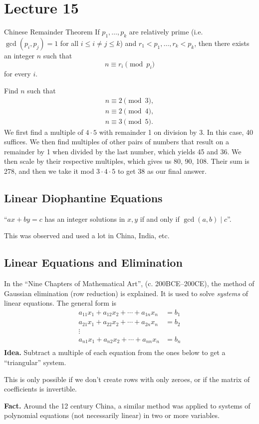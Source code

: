 \documentclass[class=article, crop=false]{standalone}
\begin{document}
  \section{Lecture 15}
  \begin{theorem}{Chinese Remainder Theorem}
    If $p_1, \dotsc, p_k$ are relatively prime (i.e. $\gcd(p_i, p_j) = 1$ for all $i \leq i\neq j \leq k$) and $r_1 < p_1,\dotsc, r_k < p_k$, then there exists an integer $n$ such that
    \[
      n\equiv r_i\pmod {p_i}
    \]
    for every $i$.
  \end{theorem}
  \begin{example}{}
    Find $n$ such that
    \begin{align*}
      n\equiv 2\pmod 3, \\
      n\equiv 2\pmod 4, \\
      n\equiv 3\pmod 5.
    \end{align*}
    We first find a multiple of $4\cdot 5$ with remainder 1 on division by 3. In this case, 40 suffices. We then find multiples of other pairs of numbers that result on a remainder by 1 when divided by the last number, which yields 45 and 36. We then scale by their respective multiples, which gives us 80, 90, 108. Their sum is 278, and then we take it mod $3\cdot 4\cdot 5$ to get 38 as our final answer.
  \end{example}
  \subsection{Linear Diophantine Equations}
  ``$ax + by = c$ has an integer solutions in $x, y$ if and only if $\gcd(a, b)\mid c$''. \par
  This was observed and used a lot in China, India, etc.
  \subsection{Linear Equations and Elimination}
  In the ``Nine Chapters of Mathematical Art'', (c. 200BCE--200CE), the method of Gaussian elimination (row reduction) is explained. It is used to solve \emph{systems} of linear equations. The general form is
  \begin{align*}
    a_{11}x_1 + a_{12}x_2 + \dotsb + a_{1n}x_n &= b_1 \\
    a_{21}x_1 + a_{22}x_2 + \dotsb + a_{2n}x_n &= b_2 \\
    \vdots\hspace{43pt} \\
    a_{n1}x_1 + a_{n2}x_2 + \dotsb + a_{nn}x_n &= b_n \\
  \end{align*}
  \textbf{Idea.} Subtract a multiple of each equation from the ones below to get a ``triangular'' system.
  \begin{note}{}
    This is only possible if we don't create rows with only zeroes, or if the matrix of coefficients is invertible.
  \end{note}
  \textbf{Fact.} Around the 12 century China, a similar method was applied to systems of polynomial equations (not necessarily linear) in two or more variables.
\end{document}
